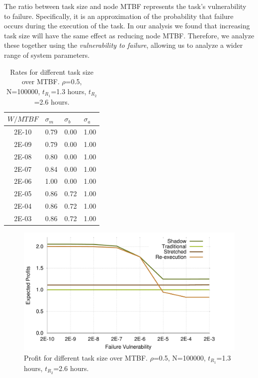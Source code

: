 The ratio between task size and node MTBF represents the task's
vulnerability to failure. Specifically, it is an approximation of the
probability that failure occurs during the execution of the task. In our
analysis we found that increasing task size will have the same effect
as reducing node MTBF. Therefore, we analyze these together using the
\textit{vulnerability to failure}, allowing us to analyze a wider range of
system parameters.

\begin{table}[!h]\small
	\caption{Rates for different task size over MTBF. $\rho$=0.5, N=100000, $t_{R_1}$=1.3 hours, $t_{R_2}$=2.6 hours.}
	\centering
		\begin{tabular}{|c|p{1cm}|p{1cm}|p{1cm}|}
		\hline
		$W/MTBF$ & $\sigma_m$ & $\sigma_b$ & $\sigma_a$ \\
		\hline
		2E-10	&	0.79 &	0.00 &	1.00 \\
		\hline
		2E-09	&	0.79 &	0.00 &	1.00 \\
		\hline
		2E-08	&	0.80 &	0.00 &	1.00 \\
		\hline
		2E-07	&	0.84 &	0.00 &	1.00 \\
		\hline
		2E-06	&	1.00 &	0.00 &	1.00 \\
		\hline
		2E-05	&	0.86 &	0.72 &	1.00 \\
		\hline
		2E-04	&	0.86 &	0.72 &	1.00 \\
		\hline
		2E-03	&	0.86 &	0.72 &	1.00 \\
		\hline
		\end{tabular}
	\label{tbl:mtbf}
\end{table}

\begin{figure}[!h]	
	\begin{center}
			\includegraphics[width=\columnwidth]{Figures/mtbf_profit}
	\end{center}
	\caption{Profit for different task size over MTBF. $\rho$=0.5, N=100000, $t_{R_1}$=1.3 hours, $t_{R_2}$=2.6 hours.}
	\label{fig:mtbf}
\end{figure}

